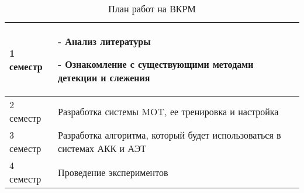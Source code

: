 \begin{table}[H]
	\caption{План работ на ВКРМ}
	\label{tab::plan}
	\begin{tabularx}{\textwidth}{| X | X |}
		\hline
		1 семестр & 
			
				- Анализ литературы
				
				- Ознакомление с существующими методами детекции и слежения 
		\\
		\hline
		2 семестр & Разработка системы MOT, ее тренировка и настройка
		\\
		\hline
		3 семестр & Разработка алгоритма, который будет использоваться в системах АКК и АЭТ 
		\\
		\hline
		4 семестр & Проведение экспериментов 
		\\
		\hline
	\end{tabularx}
\end{table}